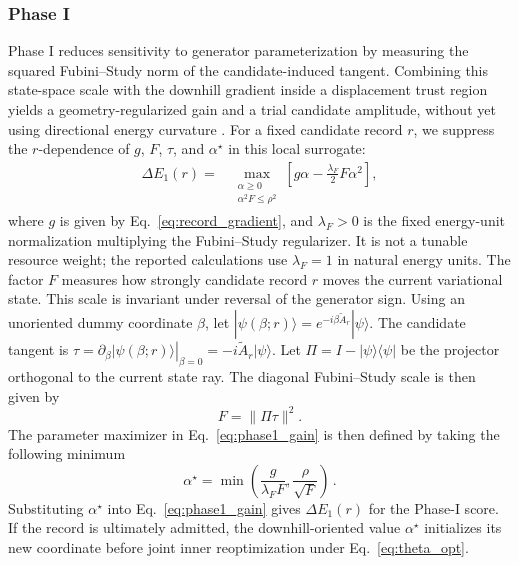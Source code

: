 \documentclass[
  reprint,
  amsmath,
  amssymb,
  aps,
  pra,
  nofootinbib,
  superscriptaddress,
  floatfix
]{revtex4-2}
\newcommand{\ket}[1]{|#1\rangle}
\newcommand{\bra}[1]{\langle #1|}
\begin{document}
\subsubsection{Phase I}
%
\noindent
Phase I reduces sensitivity to generator parameterization by measuring the
squared Fubini--Study norm of the candidate-induced tangent. Combining this
state-space scale with the downhill gradient inside a displacement trust region
yields a geometry-regularized gain and a trial candidate amplitude, without yet
using directional energy curvature \cite{Nocedal2006TrustRegion}. For a fixed
candidate record \(r\), we suppress the \(r\)-dependence of \(g\), \(F\),
\(\tau\), and \(\alpha^\star\) in this local surrogate:
%
\begin{equation}
\begin{split}
\Delta E_{1}(r)={}&\max_{\substack{\alpha\ge0\\\alpha^2F\le \rho^2}}
\left[g\alpha-\frac{\lambda_F}{2}F\alpha^2\right],
\end{split}
\label{eq:phase1_gain}
\end{equation}
%
where \(g\) is given by Eq.~\eqref{eq:record_gradient}, and \(\lambda_F>0\)
is the fixed energy-unit normalization multiplying the Fubini--Study
regularizer. It is not a tunable resource weight; the reported calculations use
\(\lambda_F=1\) in natural energy units. The factor \(F\) measures how strongly
candidate record \(r\) moves the current variational state. This scale is
invariant under reversal of the generator sign. Using an unoriented dummy
coordinate \(\beta\), let
\(\ket{\psi(\beta;r)}=e^{-i\beta\widetilde A_r}\ket{\psi}\). The candidate
tangent is
\(\tau=\left.\partial_\beta\ket{\psi(\beta;r)}\right|_{\beta=0}
=-i\widetilde A_r\ket\psi\). Let
\(\Pi=I-\ket\psi\!\bra\psi\) be the projector orthogonal to the current state
ray. The diagonal Fubini--Study scale is then given by
%
\begin{equation*}
F=\|\Pi\tau\|^2.
\end{equation*}
%
The parameter maximizer in Eq.~\eqref{eq:phase1_gain} is then defined by taking the following minimum
\begin{equation}
\alpha^\star
=
\min\!\left(
\dfrac{g}{\lambda_FF},
\dfrac{\rho}{\sqrt{F}}
\right)\,.
\label{eq:phase1_alpha_star}
\end{equation}
Substituting \(\alpha^\star\) into Eq.~\eqref{eq:phase1_gain} gives
\(\Delta E_1(r)\) for the Phase-I score. If the record is ultimately admitted,
the downhill-oriented value \(\alpha^\star\) initializes its new coordinate
before joint inner reoptimization under Eq.~\eqref{eq:theta_opt}.
\end{document}
